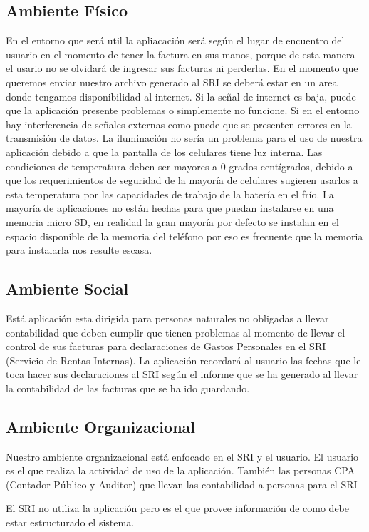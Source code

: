 \documentclass[a4paper,11pt]{article}
\begin{document}
     \subsection{ Ambiente Físico}
En el entorno que será util la apliacación será según el lugar de encuentro del usuario en el momento de tener la factura en sus manos, porque de esta manera el usario no se olvidará de ingresar sus facturas ni perderlas.
En el momento que queremos enviar nuestro archivo generado al  SRI se deberá estar en un area donde tengamos disponibilidad al internet. Si la señal de internet es baja, puede que la aplicación presente problemas o simplemente no funcione.
Si en el entorno hay interferencia de señales externas como puede que se presenten errores en la transmisión de datos.
 La iluminación no sería un problema para el uso de nuestra aplicación debido a que la pantalla de los celulares tiene luz interna.
 Las condiciones de temperatura deben ser mayores a 0 grados centígrados, debido a que los requerimientos de seguridad de la mayoría de celulares sugieren usarlos a esta temperatura por las capacidades  de trabajo de la batería en el frío.
La mayoría de aplicaciones no están hechas para que puedan instalarse en una memoria micro SD, en realidad la gran mayoría por defecto se instalan en el espacio disponible de la memoria del teléfono por eso es frecuente que la memoria para instalarla nos resulte escasa.

    \subsection{ Ambiente Social}
Está aplicación esta dirigida  para personas naturales no obligadas a llevar contabilidad que deben cumplir que tienen problemas al momento de llevar el control de sus facturas para declaraciones de Gastos Personales en el SRI (Servicio de Rentas Internas).
La aplicación recordará al usuario las fechas que le toca hacer sus declaraciones al SRI según el informe que se ha generado al llevar la contabilidad de las facturas que se ha ido guardando.
   \subsection{ Ambiente Organizacional}
Nuestro ambiente organizacional está enfocado en el SRI y el usuario. El usuario es el que realiza la actividad de uso de la aplicación. También las personas CPA (Contador Público y Auditor) que llevan las contabilidad a personas para el SRI

El SRI no utiliza la aplicación pero es el que provee información de como debe estar estructurado el sistema.
\end{document}

